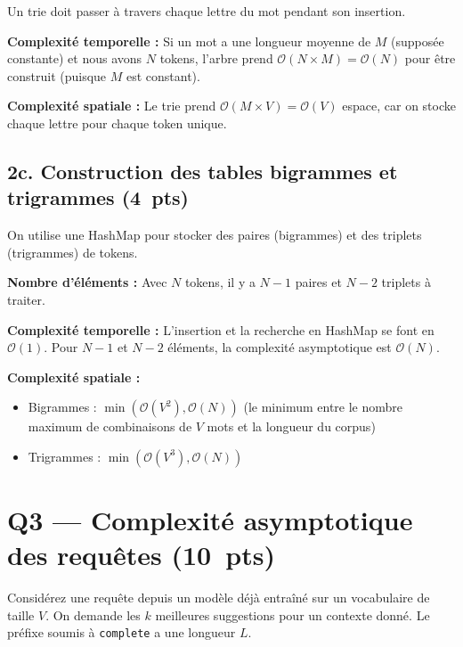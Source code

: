 \documentclass[12pt,a4paper]{article}
\newcommand{\pts}[1]{\hfill\textbf{\small(#1~pts)}}
\newcommand{\answerspace}[1]{\vspace{#1}}
\begin{document}
Un trie doit passer à travers chaque lettre du mot pendant son insertion.

\textbf{Complexité temporelle :} Si un mot a une longueur moyenne de $M$ (supposée constante) et nous avons $N$ tokens, l'arbre prend $\mathcal{O}(N \times M) = \mathcal{O}(N)$ pour être construit (puisque $M$ est constant).

\textbf{Complexité spatiale :} Le trie prend $\mathcal{O}(M \times V) = \mathcal{O}(V)$ espace, car on stocke chaque lettre pour chaque token unique.

\answerspace{6em}

\subsection*{2c. Construction des tables bigrammes et trigrammes \pts{4}}

On utilise une HashMap pour stocker des paires (bigrammes) et des triplets (trigrammes) de tokens.

\textbf{Nombre d'éléments :} Avec $N$ tokens, il y a $N-1$ paires et $N-2$ triplets à traiter.

\textbf{Complexité temporelle :} L'insertion et la recherche en HashMap se font en $\mathcal{O}(1)$. Pour $N-1$ et $N-2$ éléments, la complexité asymptotique est $\mathcal{O}(N)$.

\textbf{Complexité spatiale :} 
\begin{itemize}
  \item Bigrammes : $\min(\mathcal{O}(V^2), \mathcal{O}(N))$ (le minimum entre le nombre maximum de combinaisons de $V$ mots et la longueur du corpus)
  \item Trigrammes : $\min(\mathcal{O}(V^3), \mathcal{O}(N))$
\end{itemize}

\answerspace{6em}

\section{Q3 — Complexité asymptotique des requêtes \pts{10}}

Considérez une requête depuis un modèle déjà entraîné sur un vocabulaire de
taille $V$. On demande les $k$ meilleures suggestions pour un contexte donné.
Le préfixe soumis à \texttt{complete} a une longueur $L$.
\end{document}
